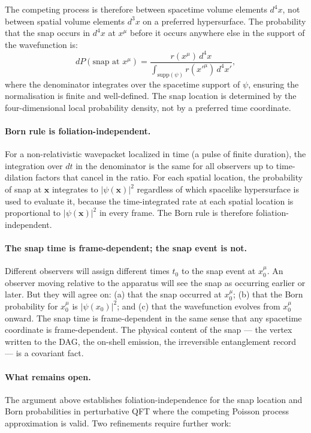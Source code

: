 \documentclass[11pt,a4paper]{article}
\theoremstyle{plain}
\theoremstyle{definition}
\theoremstyle{remark}
\begin{document}
The competing process is therefore between spacetime volume elements $d^4x$, not
between spatial volume elements $d^3x$ on a preferred hypersurface. The
probability that the snap occurs in $d^4x$ at $x^\mu$ before it occurs anywhere
else in the support of the wavefunction is:
\begin{equation}
  dP(\text{snap at } x^\mu) = \frac{r(x^\mu)\,d^4x}{\int_{\mathrm{supp}(\psi)} r(x'^\mu)\,d^4x'},
\end{equation}
where the denominator integrates over the spacetime support of $\psi$, ensuring
the normalisation is finite and well-defined. The snap location is determined by
the four-dimensional local probability density, not by a preferred time coordinate.

\paragraph{Born rule is foliation-independent.}
For a non-relativistic wavepacket localized in time (a pulse of finite duration),
the integration over $dt$ in the denominator is the same for all observers up to
time-dilation factors that cancel in the ratio. For each spatial location, the
probability of snap at $\mathbf{x}$ integrates to $|\psi(\mathbf{x})|^2$
regardless of which spacelike hypersurface is used to evaluate it, because the
time-integrated rate at each spatial location is proportional to $|\psi(\mathbf{x})|^2$
in every frame. The Born rule is therefore foliation-independent.

\paragraph{The snap time is frame-dependent; the snap event is not.}
Different observers will assign different times $t_0$ to the snap event at
$x_0^\mu$. An observer moving relative to the apparatus will see the snap as
occurring earlier or later. But they will agree on: (a) that the snap occurred at
$x_0^\mu$; (b) that the Born probability for $x_0^\mu$ is $|\psi(x_0)|^2$; and
(c) that the wavefunction evolves from $x_0^\mu$ onward. The snap time is
frame-dependent in the same sense that any spacetime coordinate is
frame-dependent. The physical content of the snap --- the vertex written to the
DAG, the on-shell emission, the irreversible entanglement record --- is a
covariant fact.

\paragraph{What remains open.}
The argument above establishes foliation-independence for the snap location and
Born probabilities in perturbative QFT where the competing Poisson process
approximation is valid. Two refinements require further work:
\end{document}
